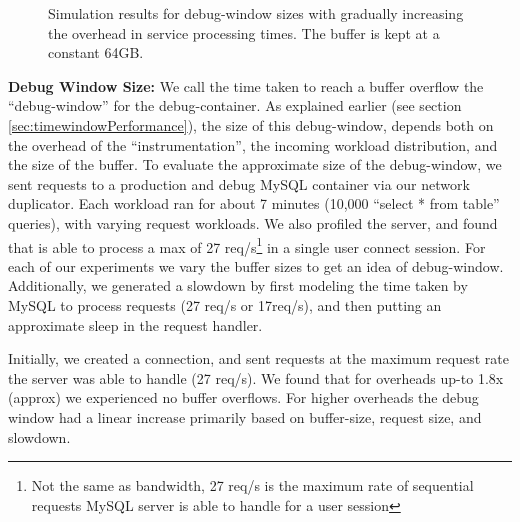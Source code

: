 \begin{figure}[ht]
\begin{adjustbox}{max size={.5\textwidth}}
	\end{adjustbox}
	\captionsetup{justification=centering}
	\caption{Simulation results for debug-window sizes with gradually increasing the overhead in service processing times. The buffer is kept at a constant 64GB.}
	\label{fig:debugSim}
\end{figure}

\noindent
\textbf{Debug Window Size:} We call the time taken to reach a buffer overflow the ``debug-window'' for the debug-container.
As explained earlier (see section \ref{sec:timewindowPerformance}), the size of this debug-window, depends both on the overhead of the ``instrumentation'', the incoming workload distribution, and the size of the buffer.
To evaluate the approximate size of the debug-window, we sent requests to a production and debug MySQL container via our network duplicator.
Each workload ran for about 7 minutes (10,000 ``select * from table'' queries), with varying request workloads.
We also profiled the server, and found that is able to process a max of 27 req/s\footnote{Not the same as bandwidth, 27 req/s is the maximum rate of sequential requests MySQL server is able to handle for a user session} in a single user connect session. 
For each of our experiments we vary the buffer sizes to get an idea of debug-window. 
Additionally, we generated a slowdown by first modeling the time taken by MySQL to process requests (27 req/s or 17req/s), and then putting an approximate sleep in the request handler.

Initially, we created a connection, and sent requests at the maximum request rate the server was able to handle (27 req/s).
We found that for overheads up-to 1.8x (approx) we experienced no buffer overflows.
For higher overheads the debug window had a linear increase primarily based on buffer-size, request size, and slowdown.

